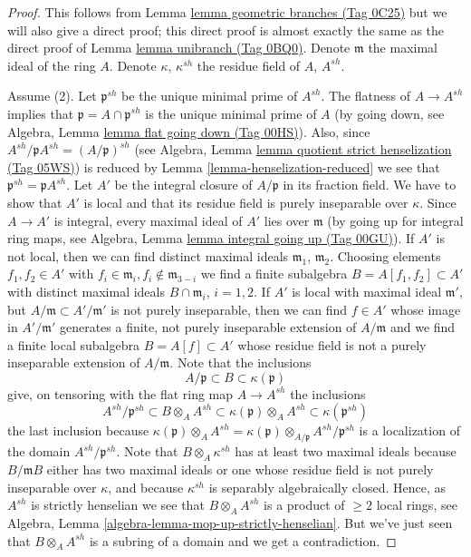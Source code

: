 \documentclass{amsart}
\theoremstyle{plain}
\theoremstyle{definition}
\theoremstyle{remark}
\numberwithin{equation}{subsection}
\begin{document}
\begin{proof}
This follows from Lemma \href{https://stacks.math.columbia.edu/tag/0C25}{lemma geometric branches (Tag 0C25)}
but we will also give a direct proof; this direct
proof is almost exactly the same as the direct proof of
Lemma \href{https://stacks.math.columbia.edu/tag/0BQ0}{lemma unibranch (Tag 0BQ0)}.
Denote $\mathfrak m$ the maximal ideal of the ring $A$.
Denote $\kappa$, $\kappa^{sh}$ the residue field of $A$, $A^{sh}$.

\medskip\noindent
Assume (2). Let $\mathfrak p^{sh}$ be the unique minimal prime of
$A^{sh}$. The flatness of $A \to A^{sh}$ implies that
$\mathfrak p = A \cap \mathfrak p^{sh}$ is the unique minimal
prime of $A$ (by going down, see
Algebra, Lemma \href{https://stacks.math.columbia.edu/tag/00HS}{lemma flat going down (Tag 00HS)}).
Also, since $A^{sh}/\mathfrak pA^{sh} = (A/\mathfrak p)^{sh}$ (see
Algebra, Lemma \href{https://stacks.math.columbia.edu/tag/05WS}{lemma quotient strict henselization (Tag 05WS)})
is reduced by Lemma \ref{lemma-henselization-reduced}
we see that $\mathfrak p^{sh} = \mathfrak pA^{sh}$.
Let $A'$ be the integral closure of $A/\mathfrak p$ in its fraction
field. We have to show that $A'$ is local and that its residue
field is purely inseparable over $\kappa$.
Since $A \to A'$ is integral, every maximal ideal of $A'$ lies over
$\mathfrak m$ (by going up for integral ring maps, see
Algebra, Lemma \href{https://stacks.math.columbia.edu/tag/00GU}{lemma integral going up (Tag 00GU)}).
If $A'$ is not local, then we can find distinct maximal ideals
$\mathfrak m_1$, $\mathfrak m_2$. Choosing elements $f_1, f_2 \in A'$
with $f_i \in \mathfrak m_i, f_i \not \in \mathfrak m_{3 - i}$ we find
a finite subalgebra $B = A[f_1, f_2] \subset A'$ with distinct maximal
ideals $B \cap \mathfrak m_i$, $i = 1, 2$. If $A'$ is local with maximal
ideal $\mathfrak m'$, but $A/\mathfrak m \subset A'/\mathfrak m'$
is not purely inseparable, then we can find $f \in A'$ whose image in
$A'/\mathfrak m'$ generates a finite, not purely inseparable extension
of $A/\mathfrak m$ and we find a finite local subalgebra $B = A[f] \subset A'$
whose residue field is not a purely inseparable extension of $A/\mathfrak m$.
Note that the inclusions
$$
A/\mathfrak p \subset B \subset \kappa(\mathfrak p)
$$
give, on tensoring with the flat ring map $A \to A^{sh}$ the inclusions
$$
A^{sh}/\mathfrak p^{sh} \subset
B \otimes_A A^{sh} \subset
\kappa(\mathfrak p) \otimes_A A^{sh} \subset
\kappa(\mathfrak p^{sh})
$$
the last inclusion because
$\kappa(\mathfrak p) \otimes_A A^{sh} =
\kappa(\mathfrak p) \otimes_{A/\mathfrak p} A^{sh}/\mathfrak p^{sh}$
is a localization of the domain $A^{sh}/\mathfrak p^{sh}$.
Note that $B \otimes_A \kappa^{sh}$ has at least two maximal ideals
because $B/\mathfrak mB$ either has two maximal ideals or one whose
residue field is not purely inseparable over $\kappa$, and because
$\kappa^{sh}$ is separably algebraically closed. Hence, as
$A^{sh}$ is strictly henselian we see that
$B \otimes_A A^{sh}$ is a product of $\geq 2$ local rings, see
Algebra, Lemma \ref{algebra-lemma-mop-up-strictly-henselian}.
But we've just seen that $B \otimes_A A^{sh}$ is a subring of a domain
and we get a contradiction.


\end{proof}
\end{document}
